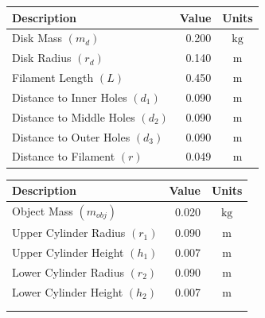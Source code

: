 \documentclass[a4paper]{article}
\begin{document}
\begin{figure}[h]
	\centering
	\begin{minipage}{0.45\textwidth}
		\centering
		\begin{tabular}{lrc}
			\toprule
			Description & Value & Units \\
			\midrule
			Disk Mass $(m_d)$ & 0.200 & $\si{\kilogram}$\\
			Disk Radius $(r_d)$ & 0.140 & $\si{\meter}$ \\
			Filament Length $(L)$ & 0.450 & $\si{\meter}$ \\
			Distance to Inner Holes $(d_1)$ & 0.090 & $\si{\meter}$\\
			Distance to Middle Holes $(d_2)$ & 0.090 & $\si{\meter}$\\
			Distance to Outer Holes $(d_3)$ & 0.090 & $\si{\meter}$\\
			Distance to Filament $(r)$ & 0.049  & $\si{\meter}$ \\
			\bottomrule
		\end{tabular}
	\end{minipage}
	\hspace{1cm}
	\begin{minipage}{0.45\textwidth}
		\centering
		\begin{tabular}{lrc}
			\toprule
			Description & Value & Units \\
			\midrule
			Object Mass $(m_{obj})$ & 0.020 & $\si{\kilogram}$ \\
			Upper Cylinder Radius $(r_1)$ & 0.090 & $\si{\meter}$ \\
			Upper Cylinder Height $(h_1)$ & 0.007 & $\si{\meter}$ \\
			Lower Cylinder Radius $(r_2)$ & 0.090 & $\si{\meter}$ \\
			Lower Cylinder Height $(h_2)$ & 0.007 & $\si{\meter}$ \\
			 & & \\
			 & & \\
			\bottomrule
		\end{tabular}
	\end{minipage}
\end{figure}
\end{document}
